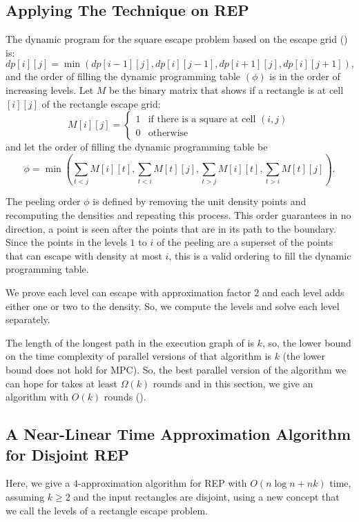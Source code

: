 \documentclass[preprint,12pt]{elsarticle}
\begin{document}
\subsection{Applying The Technique on REP}
The dynamic program for the square escape problem based on the escape grid () is:
\[
dp[i][j]=\min(dp[i-1][j],dp[i][j-1],dp[i+1][j],dp[i][j+1]),
\]
and the order of filling the dynamic programming table $(\phi)$ is in the order of increasing levels.
Let $M$ be the binary matrix that shows if a rectangle is at cell $[i][j]$ of the rectangle escape grid:
\[
M[i][j]=\begin{cases}
1 & \text{if there is a square at cell }(i,j)\\
0 & \text{otherwise}
\end{cases}
\]
and let the order of filling the dynamic programming table be
\[
\phi=\min(\sum_{t< j} M[i][t], \sum_{t< i} M[t][j],\sum_{t> j} M[i][t], \sum_{t> i} M[t][j]).
\]

The peeling order $\phi$ is defined by removing the unit density points and recomputing the densities and repeating this process. This order guarantees in no direction, a point is seen after the points that are in its path to the boundary. Since the points in the levels $1$ to $i$ of the peeling are a superset of the points that can escape with density at most $i$, this is a valid ordering to fill the dynamic programming table.

We prove each level can escape with approximation factor $2$ and each level adds either one or two to the density. So, we compute the levels and solve each level separately.

The length of the longest path in the execution graph of  is $k$, so, the lower bound on the time complexity of parallel versions of that algorithm is $k$ (the lower bound does not hold for MPC). So, the best parallel version of the algorithm we can hope for takes at least $\Omega(k)$ rounds and in this section, we give an algorithm with $O(k)$ rounds ().

\subsection{A Near-Linear Time Approximation Algorithm for Disjoint REP}
Here, we give a $4$-approximation algorithm for REP with $O(n\log n+nk)$ time, assuming $k\geq 2$ and the input rectangles are disjoint, using a new concept that we call the levels of a rectangle escape problem.
\end{document}

